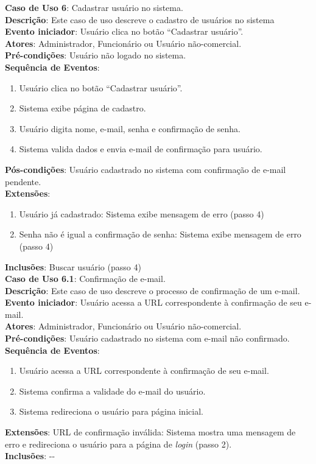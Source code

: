 \documentclass[]{politex}
\begin{document}
\noindent \textbf{Caso de Uso 6}: Cadastrar usuário no sistema.  \\
\textbf{Descrição}: Este caso de uso descreve o cadastro de usuários no sistema \\
\textbf{Evento iniciador}: Usuário clica no botão ``Cadastrar usuário''. \\
\textbf{Atores}: Administrador, Funcionário ou Usuário não-comercial. \\
\textbf{Pré-condições}: Usuário não logado no sistema. \\
\textbf{Sequência de Eventos}:
\begin{enumerate}
\item Usuário clica no botão ``Cadastrar usuário''.
\item Sistema exibe página de cadastro.
\item Usuário digita nome, e-mail, senha e confirmação de senha.
\item Sistema valida dados e envia e-mail de confirmação para usuário.
\end{enumerate}
\textbf{Pós-condições}: Usuário cadastrado no sistema com confirmação de e-mail pendente. \\
\textbf{Extensões}:
\begin{enumerate}
\item Usuário já cadastrado: Sistema exibe mensagem de erro (passo 4)
\item Senha não é igual a confirmação de senha: Sistema exibe mensagem de erro (passo 4)
\end{enumerate}
\textbf{Inclusões}: Buscar usuário (passo 4) \\

\noindent \textbf{Caso de Uso 6.1}: Confirmação de e-mail. \\
\textbf{Descrição}: Este caso de uso descreve o processo de confirmação de um e-mail. \\
\textbf{Evento iniciador}: Usuário acessa a URL correspondente à confirmação de seu e-mail. \\
\textbf{Atores}: Administrador, Funcionário ou Usuário não-comercial. \\
\textbf{Pré-condições}: Usuário cadastrado no sistema com e-mail não confirmado. \\
\textbf{Sequência de Eventos}:
\begin{enumerate}
\item Usuário acessa a URL correspondente à confirmação de seu e-mail.
\item Sistema confirma a validade do e-mail do usuário.
\item Sistema redireciona o usuário para página inicial.
\end{enumerate}
\textbf{Extensões}: URL de confirmação inválida: Sistema mostra uma mensagem de
erro e redireciona o usuário para a página de \textit{login} (passo 2). \\
\textbf{Inclusões}: -{}- \\
\end{document}
